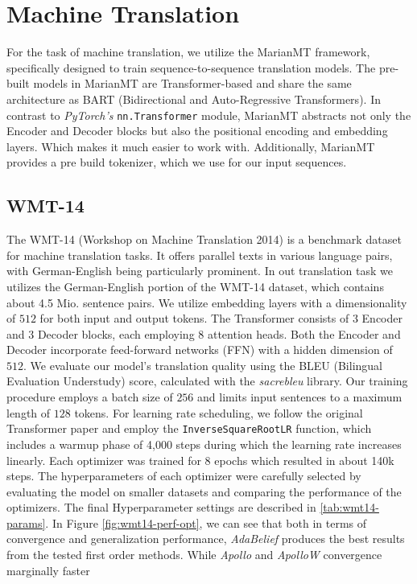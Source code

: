\section{Machine Translation}
For the task of machine translation, we utilize the MarianMT framework, specifically designed to train sequence-to-sequence translation models.
The pre-built models in MarianMT are Transformer-based and share the same architecture
as BART (Bidirectional and Auto-Regressive Transformers). In contrast to \emph{PyTorch's} \texttt{nn.Transformer} module,
MarianMT abstracts not only the Encoder and Decoder blocks but also the positional encoding and embedding layers.
Which makes it much easier to work with. Additionally, MarianMT provides a pre build tokenizer, which we use for our
input sequences.
\subsection{WMT-14}
The WMT-14 (Workshop on Machine Translation 2014) is a benchmark dataset for machine translation tasks.
It offers parallel texts in various language pairs, with German-English being particularly prominent.
In out translation task we utilizes the German-English portion of the WMT-14 dataset, which contains about 4.5 Mio. sentence pairs.
We utilize embedding layers with a dimensionality of $512$ for both input and output tokens.
The Transformer consists of $3$ Encoder and $3$ Decoder blocks, each employing $8$ attention heads.
Both the Encoder and Decoder incorporate feed-forward networks (FFN) with a hidden dimension of $512$.
We evaluate our model's translation quality using the BLEU (Bilingual Evaluation Understudy) score, calculated with the \emph{sacrebleu} library.
Our training procedure employs a batch size of $256$ and limits input sentences to a maximum length of $128$ tokens.
For learning rate scheduling, we follow the original Transformer paper \cite{AttentionIsAllUNeed} and employ the \texttt{InverseSquareRootLR} function,
which includes a warmup phase of 4,000 steps during which the learning rate increases linearly.
Each optimizer was trained for 8 epochs which resulted in about 140k steps.
The hyperparameters of each optimizer were carefully selected by evaluating the model on smaller datasets and comparing the performance of the optimizers.
The final Hyperparameter settings are described in \ref{tab:wmt14-params}. In Figure \ref{fig:wmt14-perf-opt}, we can see that both in terms of convergence and generalization performance, 
\emph{AdaBelief} produces the best results from the tested first order methods. While \emph{Apollo} and \emph{ApolloW} convergence marginally faster
